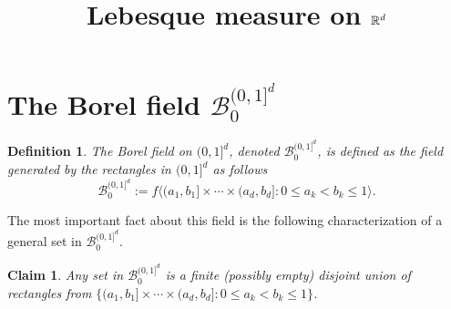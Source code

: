 \documentclass[10pt,letterpaper,twocolumn]{article}
\newtheorem{claim}{Claim}
\newtheorem{definition}{Definition}
\begin{document}
\title{Lebesque measure on $\Bbb R^d$}
\date{}
\maketitle

%
\tableofcontents


\section{The Borel field $\mathcal B_0^{(0,1]^d}$}

\begin{definition} The Borel field on $(0,1]^d$, denoted $\mathcal B_0^{(0,1]^d}$, is defined as the field generated by the rectangles in $(0,1]^d$ as follows
\[
 \mathcal B_0^{(0,1]^d}:=f\bigl \langle (a_1,b_1]\times\cdots\times (a_d,b_d] : 0\leq a_k < b_k\leq1 \bigr\rangle.
\]
\end{definition}
The most important fact about this field is the following characterization of a general set in $\mathcal B_0^{(0,1]^d}$.
\begin{claim} \label{bfield}
Any set in  $\mathcal B_0^{(0,1]^d}$ is a  finite (possibly empty) disjoint union of rectangles from $\{(a_1,b_1]\times\cdots\times (a_d,b_d] : 0\leq a_k < b_k\leq1  \}$.
\end{claim}
%
\end{document}
